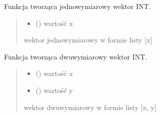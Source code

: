 \documentclass[a4paper,10pt,openany,english]{sphinxmanual}
\begin{document}

\begin{fulllineitems}
\label{\detokenize{js/js-functions:vector1i}}
\pysigstartsignatures
\pysiglinewithargsret
{}
{}
{}
\pysigstopsignatures
\sphinxAtStartPar
Funkcja tworząca jednowymiarowy wektor INT.
\begin{quote}\begin{description}
\begin{itemize}
\item {} 
\sphinxAtStartPar
{} () \textendash{} wartość x

\end{itemize}

\sphinxAtStartPar
wektor jednowymiarowy w formie listy {[}x{]}

\end{description}\end{quote}

\end{fulllineitems}


\begin{fulllineitems}
\label{\detokenize{js/js-functions:vector2i}}
\pysigstartsignatures
\pysiglinewithargsret
{}
{\sphinxparamcomma {}}
{}
\pysigstopsignatures
\sphinxAtStartPar
Funkcja tworząca dwuwymiarowy wektor INT.
\begin{quote}\begin{description}
\begin{itemize}
\item {} 
\sphinxAtStartPar
{} () \textendash{} wartość x

\item {} 
\sphinxAtStartPar
{} () \textendash{} wartość y

\end{itemize}

\sphinxAtStartPar
wektor dwuwymiarowy w formie listy {[}x, y{]}

\end{description}\end{quote}

\end{fulllineitems}
\end{document}
